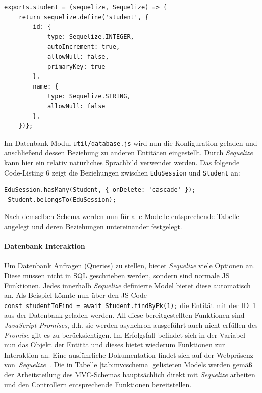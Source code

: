  \begin{lstlisting}[caption=Anlegen einer Tabelle und deren Beziehungen]
exports.student = (sequelize, Sequelize) => {
	return sequelize.define('student', {
		id: {
			type: Sequelize.INTEGER,
			autoIncrement: true,
			allowNull: false,
			primaryKey: true
		},
		name: {
			type: Sequelize.STRING,
			allowNull: false
		},
	})};
 \end{lstlisting}
 Im Datenbank Modul \texttt{util/database.js} wird nun die Konfiguration geladen und anschließend dessen Beziehung zu anderen Entitäten eingestellt. Durch \emph{Sequelize} kann hier ein relativ natürliches Sprachbild verwendet werden. Das folgende Code-Listing 6 zeigt die Beziehungen zwischen \texttt{EduSession} und \texttt{Student} an:
 \begin{lstlisting}[caption=Konfiguration von Entitätsbeziehungen]
 EduSession.hasMany(Student, { onDelete: 'cascade' });
 Student.belongsTo(EduSession);
 \end{lstlisting}
 Nach demselben Schema werden nun für alle Modelle entsprechende Tabelle angelegt und deren Beziehungen untereinander festgelegt. 
 \paragraph{Datenbank Interaktion}
 Um Datenbank Anfragen (Queries) zu stellen, bietet \emph{Sequelize} viele Optionen an. Diese müssen nicht in SQL geschrieben werden, sondern sind normale JS Funktionen. Jedes innerhalb \emph{Sequelize} definierte Model bietet diese automatisch an. Als Beispiel könnte nun über den JS Code 
 \texttt{const~studentToFind~=~await~Student.findByPk(1);} die Entität mit der ID~1 aus der Datenbank geladen werden. All diese bereitgestellten Funktionen sind \emph{JavaScript Promises}, d.h. sie werden asynchron ausgeführt auch nicht erfüllen des \emph{Promise} gilt es zu berücksichtigen.
 Im Erfolgsfall befindet sich in der Variabel nun das Objekt der Entität und dieses bietet wiederum Funktionen zur Interaktion an. Eine ausführliche Dokumentation findet sich auf der Webpräsenz von~\emph{\-Sequelize}~\cite{Depold2019}. 
 Die in Tabelle \ref{tab:mvcschema} gelisteten Models werden gemäß der Arbeitsteilung des MVC-Schemas hauptsächlich direkt mit \emph{Sequelize} arbeiten und den Controllern entsprechende Funktionen bereitstellen.
